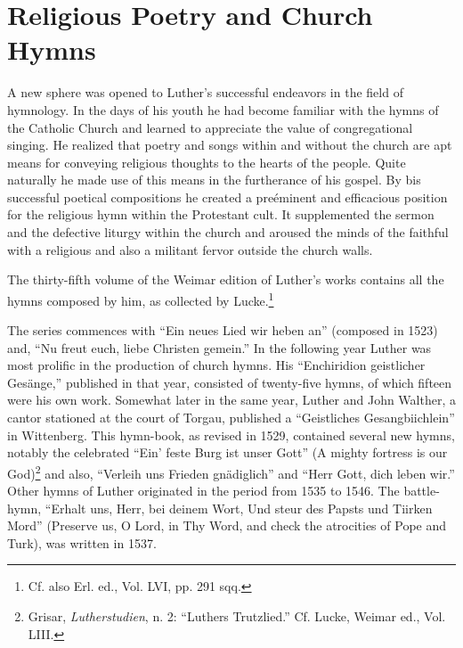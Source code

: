 \section{Religious Poetry and Church Hymns}

A new sphere was opened to Luther’s successful endeavors in the
field of hymnology. In the days of his youth he had become familiar
with the hymns of the Catholic Church and learned to appreciate the value
of congregational singing. He realized that poetry and
songs within and without the church are apt means for conveying
religious thoughts to the hearts of the people. Quite naturally he made
use of this means in the furtherance of his gospel. By bis successful
poetical compositions he created a preéminent and efficacious position
for the religious hymn within the Protestant cult. It supplemented
the sermon and the defective liturgy within the church and aroused
the minds of the faithful with a religious and also a militant fervor
outside the church walls.

The thirty-fifth volume of the Weimar edition of Luther’s works
contains all the hymns composed by him, as collected by Lucke.\footnote{Cf. also Erl. ed., Vol. LVI, pp. 291 sqq.}

The series commences with “Ein neues Lied wir heben an” (composed
in 1523) and, “Nu freut euch, liebe Christen gemein.” In the following
year Luther was most prolific in the production of church
hymns. His “Enchiridion geistlicher Gesänge,” published in that
year, consisted of twenty-five hymns, of which fifteen were his own
work. Somewhat later in the same year, Luther and John Walther,
a cantor stationed at the court of Torgau, published a “Geistliches
Gesangbiichlein” in Wittenberg. This hymn-book, as revised in 1529,
contained several new hymns, notably the celebrated “Ein’ feste Burg
ist unser Gott” (A mighty fortress is our God)\footnote{Grisar, \textit{Lutherstudien}, n. 2: “Luthers Trutzlied.” Cf. Lucke, Weimar ed., Vol. LIII.}
 and also, “Verleih
uns Frieden gnädiglich” and “Herr Gott, dich leben wir.” Other
hymns of Luther originated in the period from 1535 to 1546. The
battle-hymn, “Erhalt uns, Herr, bei deinem Wort, Und steur des
Papsts und Tiirken Mord” (Preserve us, O Lord, in Thy Word, and
check the atrocities of Pope and Turk), was written in 1537.

